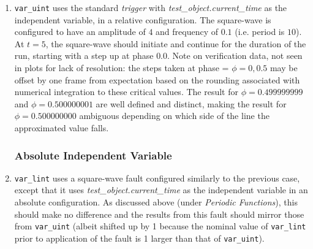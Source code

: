 \documentclass[11pt,fleqn]{report}
\begin{document}
\begin{enumerate}
\subsubsection{Periodic Functions}
Note -- for periodic functions, the difference between treating the independent
variable as \textit{absolute} or \textit{relative} is largely moot.
The function is evaluated
indirectly from the independent variable, with the independent variable used to
generate the phase of the periodic function, and the phase used to generate its
value. This phase
is always incremented (approximation to being numerically integrated) based on
the difference between the current and previous values of the independent
variable; additionally, the incremented/integrated component of the phase always
starts at $0.0$. In a sense then, the independent value is always treated as
being \textit{relative} when using periodic functions. Consequently, without
loss of generality, we can always use \textit{current\_time} (rather than
\textit{offset\_time} as the independent variable, and must apply an initial
phase offset to introduce a sign-change in the value of phase.

\subsubsection{Square Wave}
 \item \verb'var_uint' uses the standard \textit{trigger} with
   \textit{test\_object.current\_time} as the
   independent variable, in a relative configuration. The square-wave is
   configured to have an amplitude of $4$ and frequency of $0.1$ (i.e. period
   is $10$). At $t=5$, the square-wave should initiate and continue for the
   duration of the run, starting with a step up at phase $0.0$. Note on
   verification data, not seen in plots for lack of resolution: the steps taken
   at phase = $\phi = {0, 0.5}$ may be offset by one frame from expectation
   based on the rounding associated with numerical integration to these critical
   values. The result for
   $\phi=0.499999999$ and
   $\phi=0.500000001$ are well defined and distinct, making the result for
   $\phi=0.500000000$ ambiguous depending on which side of the line the
   approximated value falls.

\subsubsection{Absolute Independent Variable}
 \item \verb'var_lint' uses a square-wave fault configured similarly to the
   previous case, except that it uses \textit{test\_object.current\_time} as
   the independent variable in an absolute configuration. As discussed above
   (under \textit{Periodic Functions}), this should make no difference and the
   results from this fault should mirror those from \verb'var_uint' (albeit
   shifted up by 1 because the nominal value of \verb`var_lint` prior to
   application of the fault is 1 larger than that of \verb'var_uint').


\end{enumerate}
\end{document}
